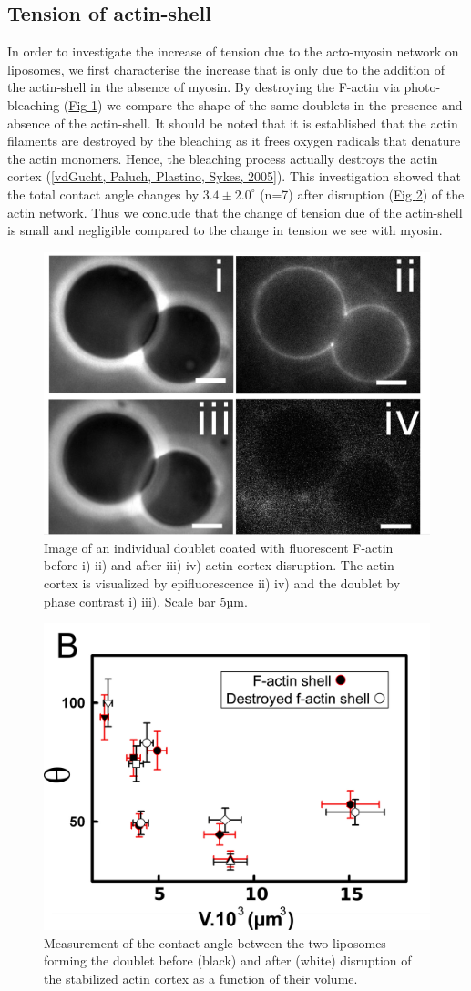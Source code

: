 \documentclass[A4paperpaper,11pt,english]{sphinxmanual}
\begin{document}
\subsection{Tension of actin-shell}
\label{parts/part4:tension-of-actin-shell}
In order to investigate the increase of tension due to the acto-myosin network
on liposomes, we first characterise the increase that is only due to the addition of the actin-shell in
the absence of myosin. By destroying the F-actin via photo-bleaching (\hyperref[parts/part4:fig2a]{Fig  \ref*{parts/part4:fig2a}}) we compare the shape of the
same doublets in the presence and absence of the actin-shell. It should be noted that it is established that the
actin filaments are destroyed by the bleaching as it frees oxygen radicals that denature the actin monomers. Hence, the bleaching process
actually destroys the actin cortex ({\hyperref[parts/part4:vandergucht2005]{{[}vdGucht, Paluch, Plastino, Sykes,  2005{]}}}).
This investigation showed that the total contact
angle changes by \(3.4 \pm 2.0 ^{\circ}\) (n=7) after disruption (\hyperref[parts/part4:fig2b]{Fig  \ref*{parts/part4:fig2b}}) of the actin network.
Thus we conclude that the change of tension due of the actin-shell is small and negligible
compared to the change in tension we see with myosin.
\begin{figure}[htbp]
\centering
\capstart

\includegraphics[width=0.500\linewidth]{Fig_02-A.png}
\caption{Image of an individual doublet coated with fluorescent F-actin before i) ii) and
after iii) iv) actin cortex disruption. The actin cortex is visualized by
epifluorescence ii) iv) and the doublet by phase contrast i) iii). Scale
bar 5µm.}\label{parts/part4:fig2a}\end{figure}
\begin{figure}[htbp]
\centering
\capstart

\includegraphics[width=0.500\linewidth]{Fig_02-B.png}
\caption{Measurement of the contact angle between the two liposomes forming the
doublet before (black) and after (white) disruption of the stabilized actin
cortex as a function of their volume.}\label{parts/part4:fig2b}\end{figure}
\end{document}
